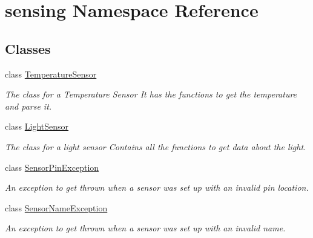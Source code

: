 \hypertarget{namespacesensing}{\section{sensing Namespace Reference}
\label{namespacesensing}
}
\subsection*{Classes}
\begin{DoxyCompactItemize}
\item 
class \hyperlink{classsensing_1_1_temperature_sensor}{Temperature\-Sensor}
\begin{DoxyCompactList}\small\item\em The class for a Temperature Sensor It has the functions to get the temperature and parse it. \end{DoxyCompactList}\item 
class \hyperlink{classsensing_1_1_light_sensor}{Light\-Sensor}
\begin{DoxyCompactList}\small\item\em The class for a light sensor Contains all the functions to get data about the light. \end{DoxyCompactList}\item 
class \hyperlink{classsensing_1_1_sensor_pin_exception}{Sensor\-Pin\-Exception}
\begin{DoxyCompactList}\small\item\em An exception to get thrown when a sensor was set up with an invalid pin location. \end{DoxyCompactList}\item 
class \hyperlink{classsensing_1_1_sensor_name_exception}{Sensor\-Name\-Exception}
\begin{DoxyCompactList}\small\item\em An exception to get thrown when a sensor was set up with an invalid name. \end{DoxyCompactList}\end{DoxyCompactItemize}
